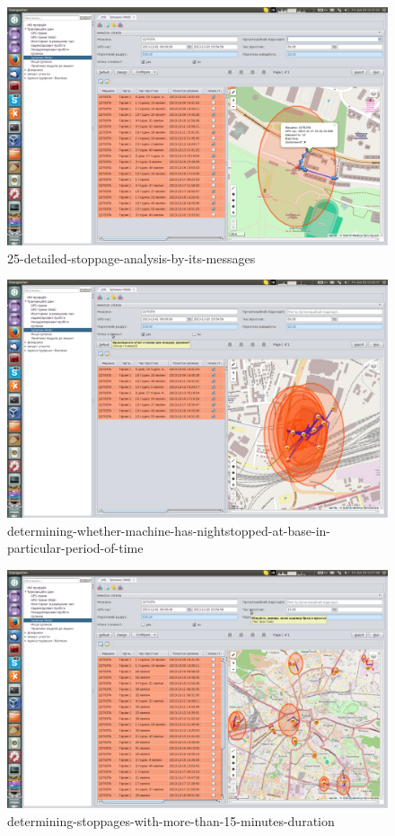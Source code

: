 \begin{figure}[H]
\centering
\includegraphics[width=\linewidth]{chapters/03-stoppages/images/25-detailed-stoppage-analysis-by-its-messages.png}
\caption{25-detailed-stoppage-analysis-by-its-messages}\label{fig:25}
\end{figure}

\begin{figure}[H]
\centering
\includegraphics[width=\linewidth]{chapters/03-stoppages/images/26-determining-whether-machine-has-nightstopped-at-base-in-particular-period-of-time.png}
\caption{determining-whether-machine-has-nightstopped-at-base-in-particular-period-of-time}\label{fig:26}
\end{figure}

\begin{figure}[H]
\centering
\includegraphics[width=\linewidth]{chapters/03-stoppages/images/27-determining-stoppages-with-more-than-15-minutes-duration.png}
\caption{determining-stoppages-with-more-than-15-minutes-duration}\label{fig:27}
\end{figure}